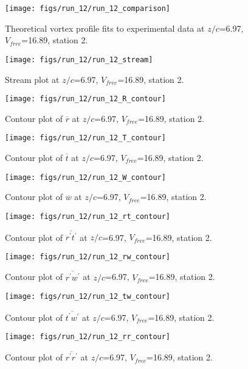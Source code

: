 \begin{figure}[H]
\centering
\texttt{[image: figs/run\_12/run\_12\_comparison]}
\caption{Theoretical vortex profile fits to experimental data at $z/c$=6.97, $V_{free}$=16.89, station 2.}
\end{figure}


\begin{figure}[H]
\centering
\texttt{[image: figs/run\_12/run\_12\_stream]}
\caption{Stream plot at $z/c$=6.97, $V_{free}$=16.89, station 2.}
\end{figure}


\begin{figure}[H]
\centering
\texttt{[image: figs/run\_12/run\_12\_R\_contour]}
\caption{Contour plot of $\overline{r}$ at $z/c$=6.97, $V_{free}$=16.89, station 2.}
\end{figure}


\begin{figure}[H]
\centering
\texttt{[image: figs/run\_12/run\_12\_T\_contour]}
\caption{Contour plot of $\overline{t}$ at $z/c$=6.97, $V_{free}$=16.89, station 2.}
\end{figure}


\begin{figure}[H]
\centering
\texttt{[image: figs/run\_12/run\_12\_W\_contour]}
\caption{Contour plot of $\overline{w}$ at $z/c$=6.97, $V_{free}$=16.89, station 2.}
\end{figure}


\begin{figure}[H]
\centering
\texttt{[image: figs/run\_12/run\_12\_rt\_contour]}
\caption{Contour plot of $\overline{r^\prime t^\prime}$ at $z/c$=6.97, $V_{free}$=16.89, station 2.}
\end{figure}


\begin{figure}[H]
\centering
\texttt{[image: figs/run\_12/run\_12\_rw\_contour]}
\caption{Contour plot of $\overline{r^\prime w^\prime}$ at $z/c$=6.97, $V_{free}$=16.89, station 2.}
\end{figure}


\begin{figure}[H]
\centering
\texttt{[image: figs/run\_12/run\_12\_tw\_contour]}
\caption{Contour plot of $\overline{t^\prime w^\prime}$ at $z/c$=6.97, $V_{free}$=16.89, station 2.}
\end{figure}


\begin{figure}[H]
\centering
\texttt{[image: figs/run\_12/run\_12\_rr\_contour]}
\caption{Contour plot of $\overline{r^\prime r^\prime}$ at $z/c$=6.97, $V_{free}$=16.89, station 2.}
\end{figure}


